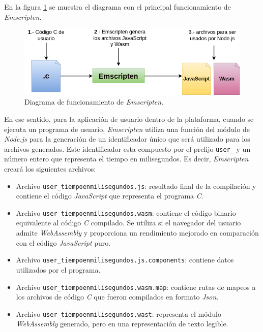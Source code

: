 En la figura \ref{fig:Emscripten} se muestra el diagrama con el principal funcionamiento de \textit{Emscripten}. 
\hfill \break

\begin{figure}[ht]
	\centering
	\includegraphics[scale=.47]{./Figures/Emscripten.png}
	\caption{Diagrama de funcionamiento de \textit{Emscripten}.}
	\label{fig:Emscripten}
\end{figure}


En ese sentido, para la aplicación de usuario dentro de la plataforma, cuando se ejecuta un programa de usuario, \textit{Emscripten} utiliza una función del módulo de \textit{Node.js} para la generación de un identificador único que será utilizado para los archivos generados. Este identificador esta compuesto por el prefijo \texttt{user\_} y un número entero que representa el tiempo en milisegundos. Es decir, \textit{Emscripten} creará los siguientes archivos:

\begin{itemize}

	\item Archivo \texttt{user\_tiempoenmilisegundos.js}: resultado final de la compilación y contiene el código \textit{JavaScript} que representa el programa \textit{C}.
	\item Archivo \texttt{user\_tiempoenmilisegundos.wasm}: contiene el código binario equivalente al código \textit{C} compilado. Se utiliza si el navegador del usuario admite \textit{WebAssembly} y proporciona un rendimiento mejorado en comparación con el código \textit{JavaScript} puro.
	\item Archivo \texttt{user\_tiempoenmilisegundos.js.components}: contiene datos utilizados por el programa.
	\item Archivo \texttt{user\_tiempoenmilisegundos.wasm.map}: contiene rutas de mapeos a los archivos de código \textit{C} que fueron compilados en formato \textit{Json}.
	\item Archivo \texttt{user\_tiempoenmilisegundos.wast}: representa el módulo \textit{WebAssembly} generado, pero en una representación de texto legible.
\end{itemize}

